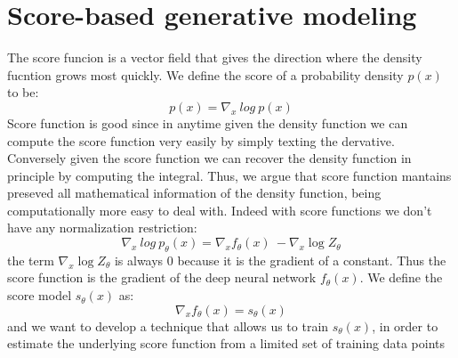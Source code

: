 \documentclass{article}
\begin{document}
   \section{Score-based generative modeling}
	The score funcion is a vector field that gives the direction where the density fucntion grows most quickly. We define the score of a probability density $p(x)$ to be:
	\begin{equation}
	p(x) = \nabla_{x}\ log\ p(x)
	\end{equation}
	Score function is good since in anytime given the density function we can compute the score function very easily by simply texting the dervative. Conversely given the score function we can recover the density function in principle by computing the integral. Thus, we argue that score function mantains preseved all mathematical information of the density function, being computationally more easy to deal with. Indeed with score functions we don't have any normalization restriction:
	\begin{equation}
	\nabla_{x}\ log\ p_{\theta}(x) = \nabla_{x}f_{\theta}(x)\ - \nabla_{x}\log Z_{\theta}
	\end{equation}
	the term $\nabla_{x}\log Z_{\theta}$ is always 0 because it is the gradient of a constant. Thus the score function is the gradient of the deep neural network $f_{\theta}(x)$. We define the score model $s_{\theta}(x)$ as:
	\begin{equation}
	\nabla_{x}f_{\theta}(x) = s_{\theta}(x)
	\end{equation}
	and we want to develop a technique that allows us to train $s_{\theta}(x)$, in order to estimate the underlying score function from a limited set of training data points
\end{document}
